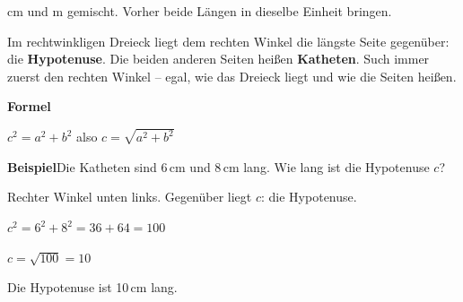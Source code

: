\documentclass[11pt]{article}
\newcommand{\nr}[1]{\makebox[7mm][l]{\textbf{#1}}}
\begin{document}
\noindent\nr{$\times$}cm und m gemischt. Vorher beide Längen in dieselbe Einheit bringen.\par
\clearpage\label{s:A}\noindent\colorbox{black!12}{}\hspace{3mm}{\Large\bfseries Hypotenuse finden und berechnen}\par\smallskip
\noindent Im rechtwinkligen Dreieck liegt dem rechten Winkel die längste Seite gegenüber: die \textbf{Hypotenuse}. Die beiden anderen Seiten heißen \textbf{Katheten}. Such immer zuerst den rechten Winkel – egal, wie das Dreieck liegt und wie die Seiten heißen.\par\medskip
\noindent\textbf{Formel}\par\nopagebreak\noindent\hspace*{4mm}\begin{minipage}{\dimexpr\linewidth-4mm\relax}$c^2 = a^2 + b^2$ \qquad also \qquad $c = \sqrt{a^2 + b^2}$ \end{minipage}\par\medskip
\noindent\textbf{Beispiel}\quad Die Katheten sind 6\,cm und 8\,cm lang. Wie lang ist die Hypotenuse $c$?\par\smallskip
\noindent\begin{minipage}[t]{0.6\linewidth}\vspace{0pt}\par\noindent{}Rechter Winkel unten links. Gegenüber liegt $c$: die Hypotenuse.\par\smallskip\par\noindent{}$c^2 = 6^2 + 8^2 = 36 + 64 = 100$\par\smallskip\par\noindent{}$c = \sqrt{100} = 10$\par\smallskip\par\noindent{}Die Hypotenuse ist 10\,cm lang.\par\smallskip\end{minipage}\hfill
\begin{minipage}[t]{0.37\linewidth}\vspace{0pt}\centering {}\end{minipage}\par\medskip
\end{document}
